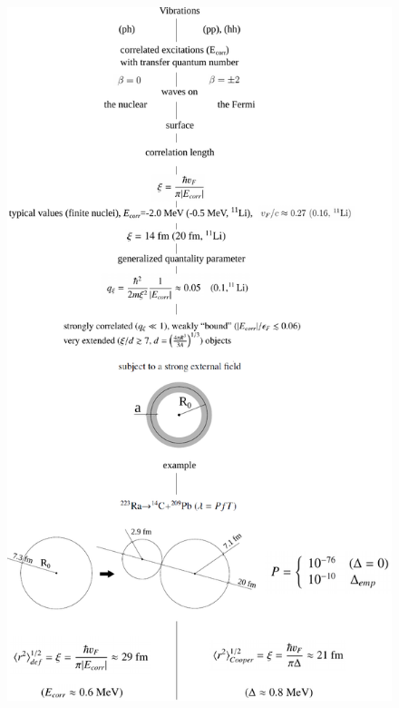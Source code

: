 \begin{subappendices}
\begin{figure}
       	\centerline{\includegraphics*[width=13cm,angle=0	]{nutshell/figs/fig3B3x}}
       	\caption{}\label{fig3B3x}
       \end{figure}

\end{subappendices}
